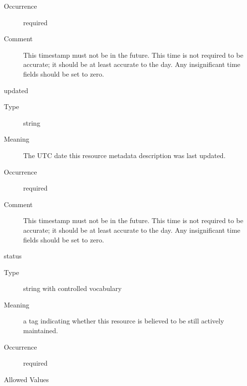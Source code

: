 \documentclass[11pt,a4paper]{ivoa}
\begin{document}
\begin{generated}
\begin{bigdescription}
\begin{description}
\item[Occurrence] required

\item[Comment] 
              This timestamp must not be in the future.  This time is
              not required to be accurate; it should be at least
              accurate to the day.  Any insignificant time fields
              should be set to zero. 
            
\end{description}
\item[updated]
\begin{description}
\item[Type] string
\item[Meaning] 
              The UTC date this resource metadata description was last updated.
            
\item[Occurrence] required

\item[Comment] 
              This timestamp must not be in the future.  This time is
              not required to be accurate; it should be at least
              accurate to the day.  Any insignificant time fields
              should be set to zero. 
            
\end{description}
\item[status]
\begin{description}
\item[Type] string with controlled vocabulary
\item[Meaning] 
              a tag indicating whether this resource is believed to be still
              actively maintained.
            
\item[Occurrence] required

\item[Allowed Values]\hfil
{}
\end{description}
\end{bigdescription}
\end{generated}
\end{document}
